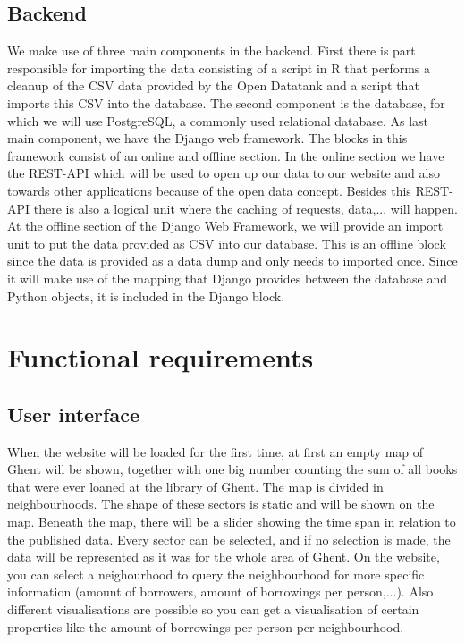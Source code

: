\subsection{Backend}
We make use of three main components in the backend.
First there is part responsible for importing the data consisting of a script in R that performs a cleanup of the CSV data provided by the Open Datatank and a script that imports this CSV into the database. The second component is the database, for which we will use PostgreSQL, a commonly used relational database. As last main component, we have the Django web framework. The blocks in this framework consist of an online and offline section. In the online section we have the REST-API which will be used to open up our data to our website and also towards other applications because of the open data concept. Besides this REST-API there is also a logical unit where the caching of requests, data,... will happen. At the offline section of the Django Web Framework, we will provide an import unit to put the data provided as CSV into our database. This is an offline block since the data is provided as a data dump and only needs to imported once. Since it will make use of the mapping that Django provides between the database and Python objects, it is included in the Django block.\\




\section{Functional requirements}

\subsection{User interface}

When the website will be loaded for the first time, at first an empty map of Ghent will be shown, together with one big number counting the sum of all books that were ever loaned at the library of Ghent. The map is divided in neighbourhoods. The shape of these sectors is static and will be shown on the map. Beneath the map, there will be a slider showing the time span in relation to the published data. Every sector can be selected, and if no selection is made, the data will be represented as it was for the whole area of Ghent.  On the website, you can select a neighourhood to query the neighbourhood for more specific information (amount of borrowers, amount of borrowings per person,...). Also different visualisations are possible so you can get a visualisation of certain properties like the amount of borrowings per person per neighbourhood.

